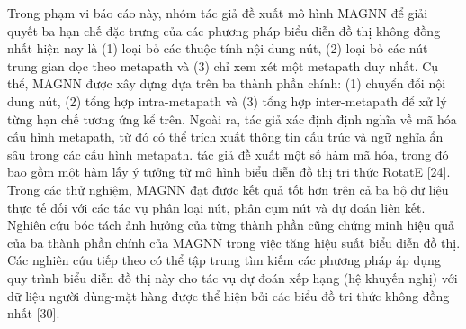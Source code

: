 Trong phạm vi báo cáo này, nhóm tác giả đề xuất mô hình MAGNN để giải quyết ba hạn chế đặc trưng của các phương pháp biểu diễn đồ thị không đồng nhất hiện nay là (1) loại bỏ các thuộc tính nội dung nút, (2) loại bỏ các nút trung gian dọc theo metapath và (3) chỉ xem xét một metapath duy nhất. Cụ thể, MAGNN được xây dựng dựa trên ba thành phần chính: (1) chuyển đổi nội dung nút, (2) tổng hợp intra-metapath và (3) tổng hợp inter-metapath để xử lý từng hạn chế tương ứng kể trên. Ngoài ra, tác giả xác định định nghĩa về mã hóa cấu hình metapath, từ đó có thể trích xuất thông tin cấu trúc và ngữ nghĩa ẩn sâu trong các cấu hình metapath. tác giả đề xuất một số hàm mã hóa, trong đó bao gồm một hàm lấy ý tưởng từ mô hình biểu diễn đồ thị tri thức RotatE [24]. Trong các thử nghiệm, MAGNN đạt được kết quả tốt hơn trên cả ba bộ dữ liệu thực tế đối với các tác vụ phân loại nút, phân cụm nút và dự đoán liên kết. Nghiên cứu bóc tách ảnh hưởng của từng thành phần cũng chứng minh hiệu quả của ba thành phần chính của MAGNN trong việc tăng hiệu suất biểu diễn đồ thị. Các nghiên cứu tiếp theo có thể tập trung tìm kiếm các phương pháp áp dụng quy trình biểu diễn đồ thị này cho tác vụ dự đoán xếp hạng (hệ khuyến nghị) với dữ liệu người dùng-mặt hàng được thể hiện bởi các biểu đồ tri thức không đồng nhất [30].
